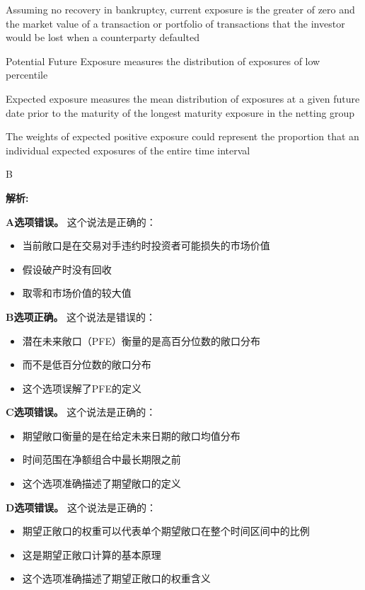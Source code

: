 \documentclass{article}
\newenvironment{explanation}
{\textbf{解析:}\par}
{\par}
\begin{document}
\begin{choices}
    \item Assuming no recovery in bankruptcy, current exposure is the greater of zero and the market value of a transaction or portfolio of transactions that the investor would be lost when a counterparty defaulted
    \item Potential Future Exposure measures the distribution of exposures of low percentile
    \item Expected exposure measures the mean distribution of exposures at a given future date prior to the maturity of the longest maturity exposure in the netting group
    \item The weights of expected positive exposure could represent the proportion that an individual expected exposures of the entire time interval
\end{choices}

\begin{correctanswer}
    B
\end{correctanswer}

\begin{explanation}
    \textbf{A选项错误。}
    这个说法是正确的：
    \begin{itemize}
        \item 当前敞口是在交易对手违约时投资者可能损失的市场价值
        \item 假设破产时没有回收
        \item 取零和市场价值的较大值
    \end{itemize}

    \textbf{B选项正确。}
    这个说法是错误的：
    \begin{itemize}
        \item 潜在未来敞口（PFE）衡量的是高百分位数的敞口分布
        \item 而不是低百分位数的敞口分布
        \item 这个选项误解了PFE的定义
    \end{itemize}

    \textbf{C选项错误。}
    这个说法是正确的：
    \begin{itemize}
        \item 期望敞口衡量的是在给定未来日期的敞口均值分布
        \item 时间范围在净额组合中最长期限之前
        \item 这个选项准确描述了期望敞口的定义
    \end{itemize}

    \textbf{D选项错误。}
    这个说法是正确的：
    \begin{itemize}
        \item 期望正敞口的权重可以代表单个期望敞口在整个时间区间中的比例
        \item 这是期望正敞口计算的基本原理
        \item 这个选项准确描述了期望正敞口的权重含义
    \end{itemize}
\end{explanation}
\end{document}
